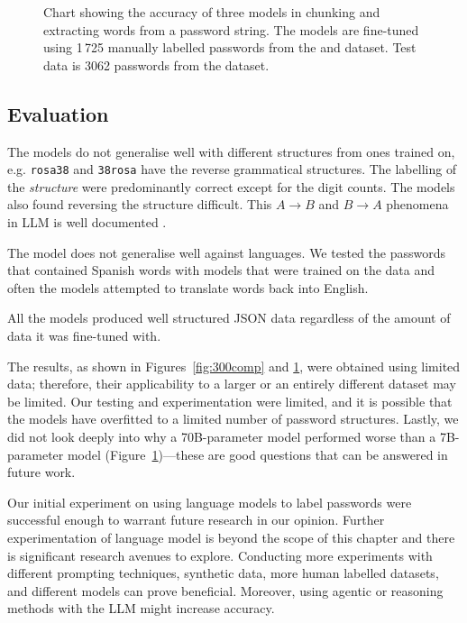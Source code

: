 \begin{figure}[t]
    \centering
    \scalebox{1}{}
    \caption{Chart showing the accuracy of three models in chunking and extracting words from a password string. The models are fine-tuned using 1\,725 manually labelled passwords from the \phpbb and \hmail dataset. Test data is 3062 passwords from the \hmail dataset.}
    \label{fig:shepduckcomp}
\end{figure}

\subsection{Evaluation}
The models do not generalise well with different structures from ones trained on, e.g. \texttt{rosa38} and \texttt{38rosa} have the reverse grammatical structures. The labelling of the \textit{structure} were predominantly correct except for the digit counts. The models also found reversing the structure difficult. This $A \rightarrow B$ and $B \rightarrow A$ phenomena in LLM is well documented \cite{Berglund_Tong_Kaufmann_Balesni_Stickland_Korbak_Evans_2023}.

The model does not generalise well against languages. We tested the \hmail passwords that contained Spanish words with models that were trained on the \phpbb data and often the models attempted to translate words back into English.

All the models produced well structured JSON data regardless of the amount of data it was fine-tuned with.

The results, as shown in Figures~\ref{fig:300comp} and \ref{fig:shepduckcomp}, were obtained using limited data; therefore, their applicability to a larger or an entirely different dataset may be limited. Our testing and experimentation were limited, and it is possible that the models have overfitted to a limited number of password structures. Lastly, we did not look deeply into why a 70B-parameter model performed worse than a 7B-parameter model (Figure~\ref{fig:shepduckcomp})---these are good questions that can be answered in future work.

Our initial experiment on using language models to label passwords were successful enough to warrant future research in our opinion. Further experimentation of language model is beyond the scope of this chapter and there is significant research avenues to explore. Conducting more experiments with different prompting techniques, synthetic data, more human labelled datasets, and different models can prove beneficial. Moreover, using agentic or reasoning methods with the LLM might increase accuracy.

